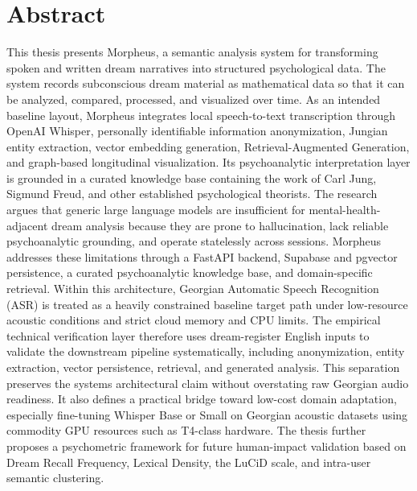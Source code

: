\documentclass[12pt,a4paper]{report}
\begin{document}
\chapter*{Abstract}
This thesis presents Morpheus, a semantic analysis system for transforming spoken and written dream narratives into structured psychological data. The system records subconscious dream material as mathematical data so that it can be analyzed, compared, processed, and visualized over time. As an intended baseline layout, Morpheus integrates local speech-to-text transcription through OpenAI Whisper, personally identifiable information anonymization, Jungian entity extraction, vector embedding generation, Retrieval-Augmented Generation, and graph-based longitudinal visualization. Its psychoanalytic interpretation layer is grounded in a curated knowledge base containing the work of Carl Jung, Sigmund Freud, and other established psychological theorists. The research argues that generic large language models are insufficient for mental-health-adjacent dream analysis because they are prone to hallucination, lack reliable psychoanalytic grounding, and operate statelessly across sessions. Morpheus addresses these limitations through a FastAPI backend, Supabase and pgvector persistence, a curated psychoanalytic knowledge base, and domain-specific retrieval. Within this architecture, Georgian Automatic Speech Recognition (ASR) is treated as a heavily constrained baseline target path under low-resource acoustic conditions and strict cloud memory and CPU limits. The empirical technical verification layer therefore uses dream-register English inputs to validate the downstream pipeline systematically, including anonymization, entity extraction, vector persistence, retrieval, and generated analysis. This separation preserves the system\textquotesingle{}s architectural claim without overstating raw Georgian audio readiness. It also defines a practical bridge toward low-cost domain adaptation, especially fine-tuning Whisper Base or Small on Georgian acoustic datasets using commodity GPU resources such as T4-class hardware. The thesis further proposes a psychometric framework for future human-impact validation based on Dream Recall Frequency, Lexical Density, the LuCiD scale, and intra-user semantic clustering.
\end{document}
